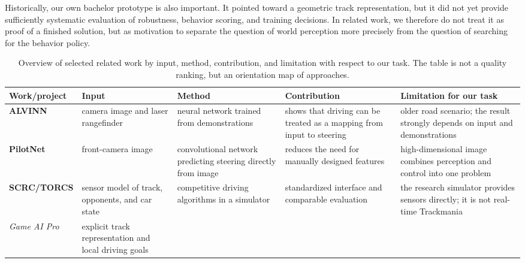 Historically, our own bachelor prototype is also important. It pointed toward a geometric track representation, but it did not yet provide sufficiently systematic evaluation of robustness, behavior scoring, and training decisions. In related work, we therefore do not treat it as proof of a finished solution, but as motivation to separate the question of world perception more precisely from the question of searching for the behavior policy.

\begin{table}[htbp]
    \centering
    \scriptsize
    \setlength{\tabcolsep}{3pt}
    \renewcommand{\arraystretch}{1.18}
    \caption[Overview of selected related work]{Overview of selected related work by input, method, contribution, and limitation with respect to our task. The table is not a quality ranking, but an orientation map of approaches.}
    \label{tab:related_work_overview}
    \begin{tabular}{>{\raggedright\arraybackslash}p{}
                    >{\raggedright\arraybackslash}p{}
                    >{\raggedright\arraybackslash}p{}
                    >{\raggedright\arraybackslash}p{}
                    >{\raggedright\arraybackslash}p{}}
        \toprule
        Work/project & Input & Method & Contribution & Limitation for our task \\
        \midrule
        \textbf{ALVINN} \cite{pomerleau1989alvinn} &
        camera image and laser rangefinder &
        neural network trained from demonstrations &
        shows that driving can be treated as a mapping from input to steering &
        older road scenario; the result strongly depends on input and demonstrations \\
        \textbf{PilotNet} \cite{bojarski2016endtoend} &
        front-camera image &
        convolutional network predicting steering directly from image &
        reduces the need for manually designed features &
        high-dimensional image combines perception and control into one problem \\
        \textbf{SCRC/TORCS} \cite{loiacono2010scrc, wymann2000torcs} &
        sensor model of track, opponents, and car state &
        competitive driving algorithms in a simulator &
        standardized interface and comparable evaluation &
        the research simulator provides sensors directly; it is not real-time Trackmania \\
        \emph{Game AI Pro} \cite{game_ai_pro_racetrack2013} &
        explicit track representation and local driving goals &

\end{tabular}
\end{table}
